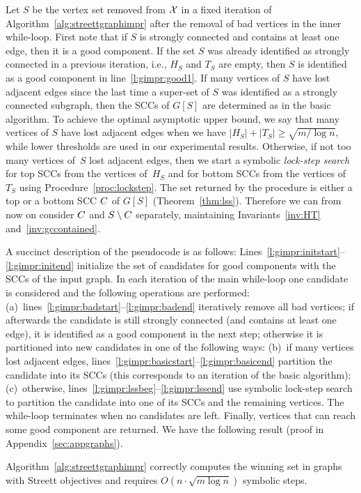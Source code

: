 \vspace{-0.5mm}
\smallskip{}
Let $S$ be the vertex set removed from $\mathcal{X}$ in a fixed iteration of 
Algorithm~\ref{alg:streettgraphimpr} after the removal of bad vertices in 
the inner while-loop. First note that if $S$ is strongly connected and contains
at least one edge, then it is a good component. If the set $S$ was already identified
as strongly connected in a previous iteration, i.e., $H_S$ and $T_S$ are empty,
then $S$ is identified as a good component in line~\ref{l:gimpr:good1}.
If many vertices of $S$ have lost adjacent edges since the last time a super-set
of $S$ was identified as a strongly connected subgraph, then 
the SCCs of $G[S]$ are determined 
as in the basic algorithm. To achieve the optimal 
asymptotic upper bound, we say that many vertices of $S$ have 
lost adjacent edges when we have 
$\lvert H_S \rvert + \lvert T_S \rvert \ge \sqrt{m / \log n}$, while lower 
thresholds are used in our experimental results.
Otherwise, if not too many vertices of~$S$ lost
adjacent edges, then we  start a symbolic \emph{lock-step search} for top
SCCs from the vertices of~$H_S$ and for bottom SCCs from the vertices
of~$T_S$ using Procedure~\ref{proc:lockstep}. 
The set returned by the procedure is either a top or a bottom SCC $C$ of
$G[S]$ (Theorem~\ref{thm:lss}). Therefore we can from now on consider $C$
and $S \setminus C$ separately, maintaining
Invariants~\ref{inv:HT} and~\ref{inv:gccontained}. 

\vspace{-0.5mm}
\smallskip{} A succinct description of the 
pseudocode is as follows: 
Lines~\ref{l:gimpr:initstart}--\ref{l:gimpr:initend} initialize the set of 
candidates for good components with the SCCs of the input graph.
In each iteration of the main while-loop one candidate is considered and the following
operations are performed:
(a)~lines~\ref{l:gimpr:badstart}--\ref{l:gimpr:badend} iteratively remove all bad vertices; if afterwards
the candidate is still strongly connected (and contains at least one edge), it is identified as a good component
in the next step; otherwise it is partitioned into new candidates in one of the following ways:
(b)~if many vertices lost adjacent edges, lines~\ref{l:gimpr:basicstart}--\ref{l:gimpr:basicend} partition the
candidate into its SCCs (this corresponds to an iteration of the basic algorithm);
(c)~otherwise, lines~\ref{l:gimpr:lssbeg}--\ref{l:gimpr:lssend} use symbolic 
lock-step search to partition the candidate into one of its SCCs and the remaining vertices.
The while-loop terminates when no candidates are left.
Finally, vertices that can reach some good component are returned.
We have the following result (proof in Appendix~\ref{sec:appgraphs}).

\vspace{-0.5mm}
\begin{thm}\label{thm:improvedgraphs}
Algorithm~\ref{alg:streettgraphimpr} correctly
computes the winning set in graphs with Streett objectives and requires
$O(n \cdot \sqrt{m \log n})$ symbolic steps.
\end{thm}
